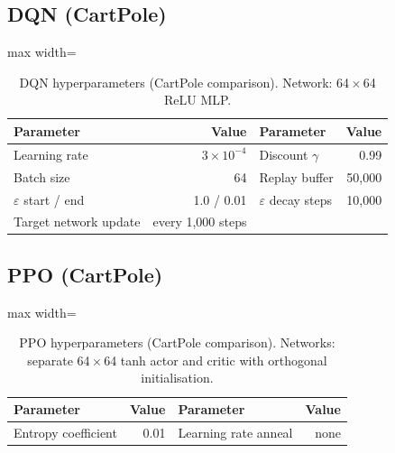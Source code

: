 \subsection*{DQN (CartPole)}
\begin{table}[htbp]
\caption{DQN hyperparameters (CartPole comparison). Network: 64\,$\times$\,64 ReLU MLP.}
\begin{center}\footnotesize
\begin{adjustbox}{max width=\columnwidth}
\begin{tabular}{|l|r|l|r|}
\hline
\textbf{Parameter} & \textbf{Value} & \textbf{Parameter} & \textbf{Value} \\
\hline
Learning rate & $3\!\times\!10^{-4}$ & Discount $\gamma$ & 0.99 \\
Batch size & 64 & Replay buffer & 50,000 \\
$\varepsilon$ start / end & 1.0 / 0.01 & $\varepsilon$ decay steps & 10,000 \\
Target network update & every 1,000 steps & & \\
\hline
\end{tabular}
\end{adjustbox}
\label{tab:hparams_dqn}
\end{center}
\end{table}

\subsection*{PPO (CartPole)}
\begin{table}[htbp]
\caption{PPO hyperparameters (CartPole comparison). Networks: separate 64\,$\times$\,64 tanh actor and critic with orthogonal initialisation.}
\begin{center}\footnotesize
\begin{adjustbox}{max width=\columnwidth}
\begin{tabular}{|l|r|l|r|}
\hline
\textbf{Parameter} & \textbf{Value} & \textbf{Parameter} & \textbf{Value} \\
\hline
Entropy coefficient & 0.01 & Learning rate anneal & none \\
\hline
\end{tabular}
\end{adjustbox}
\label{tab:hparams_ppo_cartpole}
\end{center}
\end{table}

